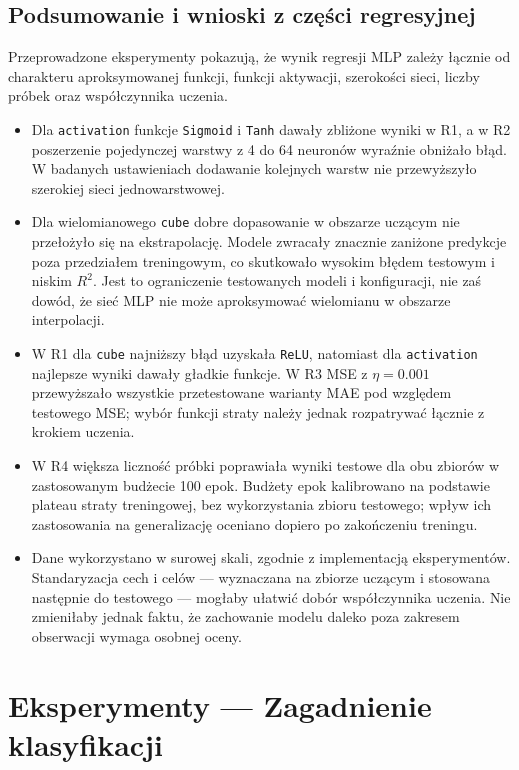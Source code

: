 \documentclass[11pt,a4paper]{article}
\begin{document}
\subsection{Podsumowanie i wnioski z części regresyjnej}
Przeprowadzone eksperymenty pokazują, że wynik regresji MLP zależy łącznie od charakteru aproksymowanej funkcji, funkcji aktywacji, szerokości sieci, liczby próbek oraz współczynnika uczenia.
\begin{itemize}
    \item Dla \texttt{activation} funkcje \texttt{Sigmoid} i \texttt{Tanh} dawały zbliżone wyniki w R1, a w R2 poszerzenie pojedynczej warstwy z 4 do 64 neuronów wyraźnie obniżało błąd. W badanych ustawieniach dodawanie kolejnych warstw nie przewyższyło szerokiej sieci jednowarstwowej.
    \item Dla wielomianowego \texttt{cube} dobre dopasowanie w obszarze uczącym nie przełożyło się na ekstrapolację. Modele zwracały znacznie zaniżone predykcje poza przedziałem treningowym, co skutkowało wysokim błędem testowym i niskim $R^2$. Jest to ograniczenie testowanych modeli i konfiguracji, nie zaś dowód, że sieć MLP nie może aproksymować wielomianu w obszarze interpolacji.
    \item W R1 dla \texttt{cube} najniższy błąd uzyskała \texttt{ReLU}, natomiast dla \texttt{activation} najlepsze wyniki dawały gładkie funkcje. W R3 MSE z $\eta=0.001$ przewyższało wszystkie przetestowane warianty MAE pod względem testowego MSE; wybór funkcji straty należy jednak rozpatrywać łącznie z krokiem uczenia.
    \item W R4 większa liczność próbki poprawiała wyniki testowe dla obu zbiorów w zastosowanym budżecie 100 epok. Budżety epok kalibrowano na podstawie plateau straty treningowej, bez wykorzystania zbioru testowego; wpływ ich zastosowania na generalizację oceniano dopiero po zakończeniu treningu.
    \item Dane wykorzystano w surowej skali, zgodnie z implementacją eksperymentów. Standaryzacja cech i celów — wyznaczana na zbiorze uczącym i stosowana następnie do testowego — mogłaby ułatwić dobór współczynnika uczenia. Nie zmieniłaby jednak faktu, że zachowanie modelu daleko poza zakresem obserwacji wymaga osobnej oceny.
\end{itemize}


\section{Eksperymenty — Zagadnienie klasyfikacji}
\end{document}
